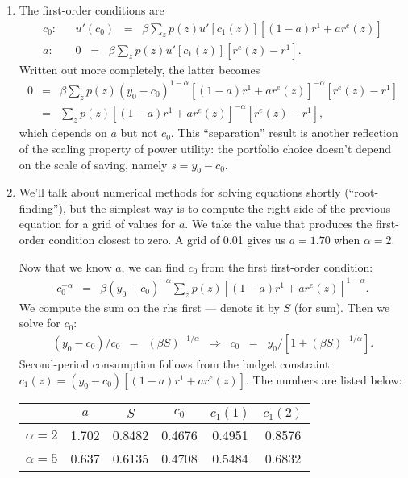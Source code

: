 \documentclass[11pt]{article}
\begin{document}
\begin{enumerate}
\begin{enumerate}
\item The first-order conditions are
\begin{eqnarray*}
    c_0:  &&  u'(c_0) \;\;=\;\; \beta \sum_z p(z)
            u'[c_1(z)] [ (1-a)r^1 + a r^e(z)] \\
    a:    && 0 \;\;=\;\; \beta \sum_z p(z) u'[c_1(z)] [r^e(z) - r^1 ]  .
\end{eqnarray*}
Written out more completely, the latter becomes
\begin{eqnarray*}
    0 &=& \beta \sum_z p(z) (y_0-c_0)^{1-\alpha} [ (1-a)r^1 + a r^e(z)]^{-\alpha} [r^e(z) - r^1 ] \\
    &=&  \sum_z p(z) [ (1-a)r^1 + a r^e(z)]^{-\alpha} [r^e(z) - r^1 ] ,
\end{eqnarray*}
which depends on $a$ but not $c_0$.
This ``separation'' result is another reflection of the scaling property of
power utility:  the portfolio choice doesn't depend on the scale of saving, namely
$ s = y_0 - c_0 $.

\item
We'll talk about numerical methods for solving equations shortly (``root-finding''),
but the simplest way is to compute the right side of the previous equation
for a grid of values for $a$.
We take the value that produces the first-order condition closest to zero.
A grid of 0.01 gives us $a=1.70$ when $\alpha=2$.

Now that we know $a$, we can find $c_0$ from the first first-order condition:
\begin{eqnarray*}
    c_0^{-\alpha}  &=&  \beta (y_0-c_0)^{-\alpha}
            \sum_z p(z) [ (1-a)r^1 + a r^e(z)]^{1-\alpha}  .
\end{eqnarray*}
We compute the sum on the rhs first --- denote it by $S$ (for sum).
Then we solve for $c_0$:
\begin{eqnarray*}
    (y_0-c_0)/c_0 &=& (\beta S)^{-1/\alpha}
        \;\;\Rightarrow\;\;
        c_0  \;\;=\;\; y_0 /[ 1 + (\beta S)^{-1/\alpha}] .
\end{eqnarray*}
Second-period consumption follows from the budget constraint:
$c_1(z)=  (y_0-c_0)[(1-a) r^1 + a r^e(z)] $.
The numbers are listed below:
\begin{center}
\begin{tabular}{lccccc}
\toprule
                &  $a$  &  $S$    & $c_0$   &  $c_1(1)$ &  $c_1(2)$  \\
\midrule
$\alpha = 2$    & 1.702 & 0.8482  & 0.4676  & 0.4951    & 0.8576 \\
$\alpha = 5$    & 0.637 & 0.6135  & 0.4708  & 0.5484    & 0.6832 \\
\bottomrule
\end{tabular}
\end{center}


\end{enumerate}
\end{enumerate}
\end{document}
